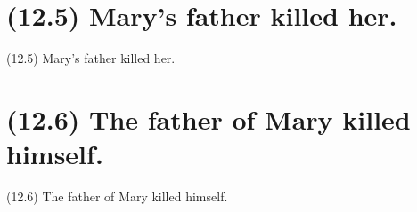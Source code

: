 \documentclass{article}
\begin{document}
\clearpage

%
%

\section*{(12.5) Mary's father killed her.}

\bigbreak
\begin{enumerate*}
\item[(12.5)] Mary's father killed her.
\end{enumerate*}
\bigbreak

\bigbreak
\begin{minipage}{\textwidth}
\end{minipage}
\bigbreak

\clearpage

%
%

\section*{(12.6) The father of Mary killed himself.}

\bigbreak
\begin{enumerate*}
\item[(12.6)] The father of Mary killed himself.
\end{enumerate*}
\bigbreak

\bigbreak
\begin{minipage}{\textwidth}
\end{minipage}
\bigbreak
\end{document}
